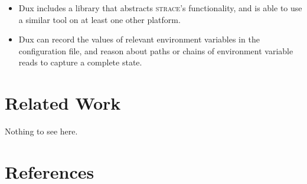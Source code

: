 \documentclass[10pt,conference]{IEEEtran}
\begin{document}
\begin{itemize}
\item{Dux includes a library that abstracts \textsc{strace}'s functionality, and is able to use a similar tool
on at least one other platform.}
\item{Dux can record the values of relevant environment variables in the configuration file,
and reason about paths or chains of environment variable reads to capture a complete state.}
\end{itemize}

\section{Related Work}

Nothing to see here.

\section{References}

\begingroup
\renewcommand{\section}[2]{}%



%
%
\endgroup
\end{document}
